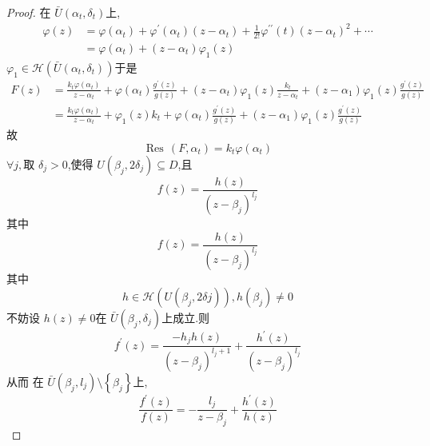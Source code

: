 \documentclass[../../复变函数.tex]{subfiles}
\begin{document}
\begin{proof}
    在 \(  \bar{U}\left(  \alpha _{t}, \delta  _{t} \right)   \)上, \[
    \begin{aligned}
     \varphi \left( z \right)&=  \varphi \left( \alpha _{t} \right)+  \varphi ^{\prime} \left(  \alpha _{t} \right)\left( z-\alpha _{t} \right)+ \frac{1 }{2! } \varphi ^{\prime \prime} \left( t \right)\left( z-\alpha _{t} \right)^{2}+ \cdots \\ 
      &=  \varphi \left( \alpha _{t} \right)+ \left( z-\alpha _{t} \right) \varphi _1 \left( z \right)           
    \end{aligned}
    \] \(   \varphi _1  \in \mathcal{H}\left( \bar{U}\left( \alpha _{t}, \delta  _{t} \right)  \right)   \)于是 \[
   \begin{aligned}
    F\left( z \right)&= \frac{k_{t} \varphi \left( \alpha _{t} \right)  }{z-\alpha _{t} }+  \varphi \left( \alpha _{t} \right)\frac{g^{\prime} \left( z \right)  }{g\left( z \right)  }+  \left( z-\alpha _{t} \right) \varphi _1 \left( z \right) \frac{k_{t} }{z-\alpha _{t} }+  \left( z-\alpha _1  \right) \varphi _1 \left( z \right)\frac{g^{\prime} \left( z \right)  }{g\left( z \right)  }     \\ 
     &= \frac{k_{t} \varphi \left( \alpha _{t} \right)  }{z-\alpha _{t} }+     \varphi _1 \left( z \right)k_{t}+  \varphi \left( \alpha _{t} \right)\frac{g^{\prime} \left( z \right)  }{g\left( z \right)  }+ \left( z-\alpha _1  \right) \varphi _1 \left( z \right)\frac{g^{\prime} \left( z \right)  }{ g\left( z \right) }       
   \end{aligned}   
    \] 故 \[
    \operatorname{Res}\,\left( F,\alpha _{t} \right)= k_{t} \varphi \left( \alpha _{t} \right)  
    \] 
    \(  \forall j,  \)取 \(   \delta  _{j}> 0  \),使得 \(  U\left( \beta _{j},2 \delta  _{j} \right)\subseteq D   \),且 \[
    f\left( z \right)= \frac{h\left( z \right)  }{\left( z-\beta _{j} \right)^{l_{j}}  }  
    \]其中 \[
    f\left( z \right)= \frac{h\left( z \right)  }{\left( z-\beta _{j} \right)^{l_{j}}  }  
    \]其中 \[
    h \in \mathcal{H}\left( U\left( \beta _{j},2 \delta  j \right)  \right), h\left( \beta _{j} \right)\neq 0  
    \]不妨设 \(  h\left( z \right)\neq 0   \)在 \(  \bar{U}\left( \beta _{j}, \delta  _{j} \right)   \)上成立.则 \[
    f^{\prime} \left( z \right)=  \frac{-h_{j}h\left( z \right)  }{ \left( z-\beta _{j} \right)^{l_{j}+ 1} } +  \frac{h^{\prime} \left( z \right)  }{\left( z-\beta _{j} \right)^{l_{j}}  }   
    \]从而 在 \(  \bar{U}\left( \beta _{j},l_{j} \right)\setminus \left\{ \beta _{j} \right\}   \)上, \[
    \frac{f^{\prime} \left( z \right)  }{f\left( z \right)  }=  -\frac{l_{j} }{z-\beta _{j} }+  \frac{h^{\prime} \left( z \right)  }{h\left( z \right)  }   
\]
\end{proof}
\end{document}
